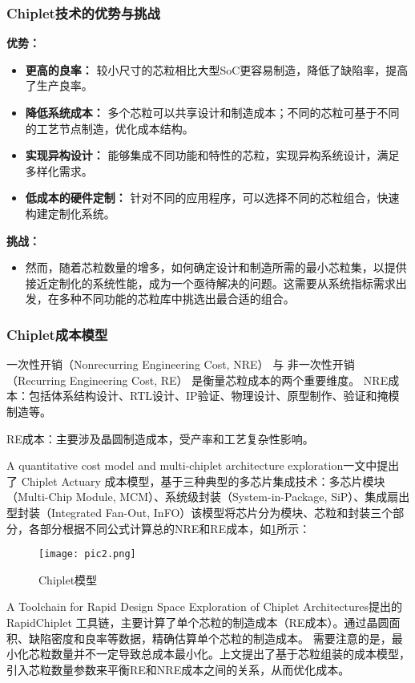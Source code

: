 \documentclass[bachelor]{thesis-uestc}
\begin{document}
\subsubsection{Chiplet技术的优势与挑战}

\textbf{优势：}
\begin{itemize}
    \item \textbf{更高的良率：} 较小尺寸的芯粒相比大型SoC更容易制造，降低了缺陷率，提高了生产良率。
    \item \textbf{降低系统成本：} 多个芯粒可以共享设计和制造成本；不同的芯粒可基于不同的工艺节点制造，优化成本结构。
    \item \textbf{实现异构设计：} 能够集成不同功能和特性的芯粒，实现异构系统设计，满足多样化需求。
    \item \textbf{低成本的硬件定制：} 针对不同的应用程序，可以选择不同的芯粒组合，快速构建定制化系统。
\end{itemize}

\textbf{挑战：}
\begin{itemize}
    \item 然而，随着芯粒数量的增多，如何确定设计和制造所需的最小芯粒集，以提供接近定制化的系统性能，成为一个亟待解决的问题。这需要从系统指标需求出发，在多种不同功能的芯粒库中挑选出最合适的组合。
\end{itemize}

\subsubsection{Chiplet成本模型}
一次性开销（Nonrecurring Engineering Cost, NRE） 与 非一次性开销（Recurring Engineering Cost, RE） 是衡量芯粒成本的两个重要维度。
NRE成本：包括体系结构设计、RTL设计、IP验证、物理设计、原型制作、验证和掩模制造等。


RE成本：主要涉及晶圆制造成本，受产率和工艺复杂性影响。


A quantitative cost model and multi-chiplet architecture exploration一文中提出了 Chiplet Actuary 成本模型，基于三种典型的多芯片集成技术：多芯片模块（Multi-Chip Module, MCM）、系统级封装（System-in-Package, SiP）、集成扇出型封装（Integrated Fan-Out, InFO）该模型将芯片分为模块、芯粒和封装三个部分，各部分根据不同公式计算总的NRE和RE成本，如\ref{pic2}所示：
\begin{figure}[h]
\texttt{[image: pic2.png]}
\caption{Chiplet模型}
\label{pic2}
\end{figure}

A Toolchain for Rapid Design Space Exploration of Chiplet Architectures提出的 RapidChiplet 工具链，主要计算了单个芯粒的制造成本（RE成本）。通过晶圆面积、缺陷密度和良率等数据，精确估算单个芯粒的制造成本。
需要注意的是，最小化芯粒数量并不一定导致总成本最小化。上文提出了基于芯粒组装的成本模型，引入芯粒数量参数来平衡RE和NRE成本之间的关系，从而优化成本。
\end{document}
